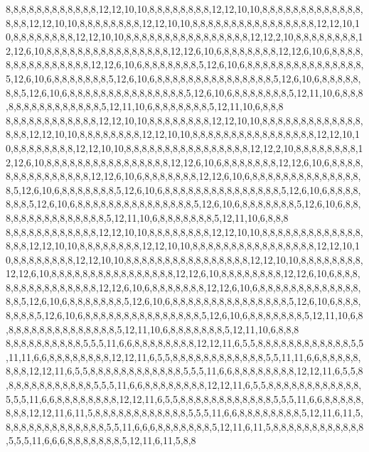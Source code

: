 8,8,8,8,8,8,8,8,8,8,8,8,12,12,10,10,8,8,8,8,8,8,8,8,12,12,10,10,8,8,8,8,8,8,8,8,8,8,8,8,8,8,8,8,12,12,10,10,8,8,8,8,8,8,8,8,12,12,10,10,8,8,8,8,8,8,8,8,8,8,8,8,8,8,8,8,12,12,10,10,8,8,8,8,8,8,8,8,12,12,10,10,8,8,8,8,8,8,8,8,8,8,8,8,8,8,8,8,12,12,2,10,8,8,8,8,8,8,8,8,12,12,6,10,8,8,8,8,8,8,8,8,8,8,8,8,8,8,8,8,12,12,6,10,6,8,8,8,8,8,8,8,12,12,6,10,6,8,8,8,8,8,8,8,8,8,8,8,8,8,8,8,12,12,6,10,6,8,8,8,8,8,8,8,5,12,6,10,6,8,8,8,8,8,8,8,8,8,8,8,8,8,8,8,5,12,6,10,6,8,8,8,8,8,8,8,5,12,6,10,6,8,8,8,8,8,8,8,8,8,8,8,8,8,8,8,5,12,6,10,6,8,8,8,8,8,8,8,5,12,6,10,6,8,8,8,8,8,8,8,8,8,8,8,8,8,8,8,5,12,6,10,6,8,8,8,8,8,8,8,5,12,11,10,6,8,8,8,8,8,8,8,8,8,8,8,8,8,8,8,5,12,11,10,6,8,8,8,8,8,8,8,5,12,11,10,6,8,8,8
8,8,8,8,8,8,8,8,8,8,8,8,12,12,10,10,8,8,8,8,8,8,8,8,12,12,10,10,8,8,8,8,8,8,8,8,8,8,8,8,8,8,8,8,12,12,10,10,8,8,8,8,8,8,8,8,12,12,10,10,8,8,8,8,8,8,8,8,8,8,8,8,8,8,8,8,12,12,10,10,8,8,8,8,8,8,8,8,12,12,10,10,8,8,8,8,8,8,8,8,8,8,8,8,8,8,8,8,12,12,2,10,8,8,8,8,8,8,8,8,12,12,6,10,8,8,8,8,8,8,8,8,8,8,8,8,8,8,8,8,12,12,6,10,6,8,8,8,8,8,8,8,12,12,6,10,6,8,8,8,8,8,8,8,8,8,8,8,8,8,8,8,12,12,6,10,6,8,8,8,8,8,8,8,12,12,6,10,6,8,8,8,8,8,8,8,8,8,8,8,8,8,8,8,5,12,6,10,6,8,8,8,8,8,8,8,5,12,6,10,6,8,8,8,8,8,8,8,8,8,8,8,8,8,8,8,5,12,6,10,6,8,8,8,8,8,8,8,5,12,6,10,6,8,8,8,8,8,8,8,8,8,8,8,8,8,8,8,5,12,6,10,6,8,8,8,8,8,8,8,5,12,6,10,6,8,8,8,8,8,8,8,8,8,8,8,8,8,8,8,5,12,11,10,6,8,8,8,8,8,8,8,5,12,11,10,6,8,8,8
8,8,8,8,8,8,8,8,8,8,8,8,12,12,10,10,8,8,8,8,8,8,8,8,12,12,10,10,8,8,8,8,8,8,8,8,8,8,8,8,8,8,8,8,12,12,10,10,8,8,8,8,8,8,8,8,12,12,10,10,8,8,8,8,8,8,8,8,8,8,8,8,8,8,8,8,12,12,10,10,8,8,8,8,8,8,8,8,12,12,10,10,8,8,8,8,8,8,8,8,8,8,8,8,8,8,8,8,12,12,10,10,8,8,8,8,8,8,8,8,12,12,6,10,8,8,8,8,8,8,8,8,8,8,8,8,8,8,8,8,12,12,6,10,8,8,8,8,8,8,8,8,12,12,6,10,6,8,8,8,8,8,8,8,8,8,8,8,8,8,8,8,12,12,6,10,6,8,8,8,8,8,8,8,12,12,6,10,6,8,8,8,8,8,8,8,8,8,8,8,8,8,8,8,5,12,6,10,6,8,8,8,8,8,8,8,5,12,6,10,6,8,8,8,8,8,8,8,8,8,8,8,8,8,8,8,5,12,6,10,6,8,8,8,8,8,8,8,5,12,6,10,6,8,8,8,8,8,8,8,8,8,8,8,8,8,8,8,5,12,6,10,6,8,8,8,8,8,8,8,5,12,11,10,6,8,8,8,8,8,8,8,8,8,8,8,8,8,8,8,5,12,11,10,6,8,8,8,8,8,8,8,5,12,11,10,6,8,8,8
8,8,8,8,8,8,8,8,8,8,5,5,5,11,6,6,8,8,8,8,8,8,8,8,12,12,11,6,5,5,8,8,8,8,8,8,8,8,8,8,8,8,5,5,11,11,6,6,8,8,8,8,8,8,8,8,12,12,11,6,5,5,8,8,8,8,8,8,8,8,8,8,8,8,5,5,11,11,6,6,8,8,8,8,8,8,8,8,12,12,11,6,5,5,8,8,8,8,8,8,8,8,8,8,8,8,5,5,5,11,6,6,8,8,8,8,8,8,8,8,12,12,11,6,5,5,8,8,8,8,8,8,8,8,8,8,8,8,5,5,5,11,6,6,8,8,8,8,8,8,8,8,12,12,11,6,5,5,8,8,8,8,8,8,8,8,8,8,8,8,5,5,5,11,6,6,8,8,8,8,8,8,8,8,12,12,11,6,5,5,8,8,8,8,8,8,8,8,8,8,8,8,5,5,5,11,6,6,8,8,8,8,8,8,8,8,12,12,11,6,11,5,8,8,8,8,8,8,8,8,8,8,8,8,5,5,5,11,6,6,8,8,8,8,8,8,8,8,5,12,11,6,11,5,8,8,8,8,8,8,8,8,8,8,8,8,8,5,5,11,6,6,6,8,8,8,8,8,8,8,5,12,11,6,11,5,8,8,8,8,8,8,8,8,8,8,8,8,5,5,5,11,6,6,6,8,8,8,8,8,8,8,5,12,11,6,11,5,8,8
